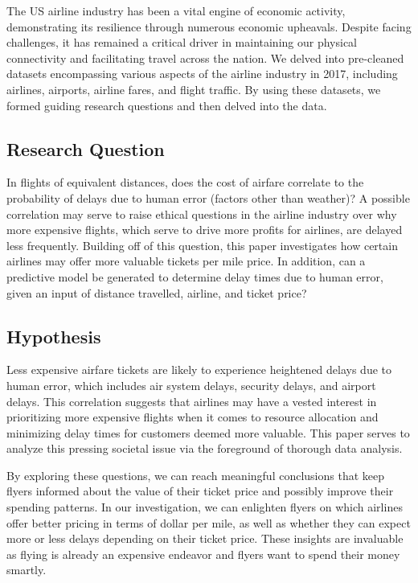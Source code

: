 \documentclass{article}
\begin{document}
The US airline industry has been a vital engine of economic activity, demonstrating its resilience through numerous economic upheavals. Despite facing challenges, it has remained a critical driver in maintaining our physical connectivity and facilitating travel across the nation. We delved into pre-cleaned datasets encompassing various aspects of the airline industry in 2017, including airlines, airports, airline fares, and flight traffic. By using these datasets, we formed guiding research questions and then delved into the data. 

\subsection{Research Question}
In flights of equivalent distances, does the cost of airfare correlate to the probability of delays due to human error (factors other than weather)? A possible correlation may serve to raise ethical questions in the airline industry over why more expensive flights, which serve to drive more profits for airlines, are delayed less frequently. Building off of this question, this paper investigates how certain airlines may offer more valuable tickets per mile price. In addition, can a predictive model be generated to determine delay times due to human error, given an input of distance travelled, airline, and ticket price?

\subsection{Hypothesis}

Less expensive airfare tickets are likely to experience heightened delays due to human error, which includes air system delays, security delays, and airport delays. This correlation suggests that airlines may have a vested interest in prioritizing more expensive flights when it comes to resource allocation and minimizing delay times for customers deemed more valuable. This paper serves to analyze this pressing societal issue via the foreground of thorough data analysis. 



By exploring these questions, we can reach meaningful conclusions that keep flyers informed about the value of their ticket price and possibly improve their spending patterns. In our investigation, we can enlighten flyers on which airlines offer better pricing in terms of dollar per mile, as well as whether they can expect more or less delays depending on their ticket price. These insights are invaluable as flying is already an expensive endeavor and flyers want to spend their money smartly. 
\end{document}
